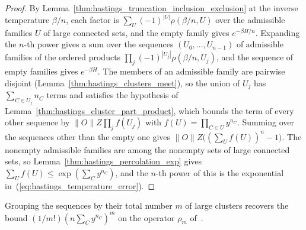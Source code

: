 \begin{proof}
    \leanok
    By Lemma~\ref{thm:hastings_truncation_inclusion_exclusion} at the inverse
    temperature $\beta/n$, each factor is $\sum_U(-1)^{|U|}\rho(\beta/n,U)$ over
    the admissible families $U$ of large connected sets, and the empty family
    gives $e^{-\beta H/n}$. Expanding the $n$-th power gives a sum over the
    sequences $(U_0,\dots,U_{n-1})$ of admissible families of the ordered
    products $\prod_j(-1)^{|U_j|}\rho(\beta/n,U_j)$, and the sequence of empty
    families gives $e^{-\beta H}$. The members of an admissible family are
    pairwise disjoint (Lemma~\ref{thm:hastings_clusters_meet}), so the union
    of $U_j$ has $\sum_{C\in U_j}n_C$ terms and satisfies the hypothesis of
    Lemma~\ref{thm:hastings_cluster_part_product}, which bounds the term of
    every other sequence by $\|O\|Z\prod_jf(U_j)$ with
    $f(U)=\prod_{C\in U}y^{n_C}$. Summing over the sequences other than the
    empty one gives $\|O\|Z\bigl((\sum_Uf(U))^n-1\bigr)$. The nonempty admissible
    families are among the nonempty sets of large connected sets, so
    Lemma~\ref{thm:hastings_percolation_exp} gives
    $\sum_Uf(U)\le\exp(\sum_Cy^{n_C})$, and the $n$-th power of this is the
    exponential in~(\ref{eq:hastings_temperature_error}).
\end{proof}

Grouping the sequences by their total number $m$ of large clusters recovers the
bound $(1/m!)(n\sum_Cy^{n_C})^m$ on the operator $\rho_m$
of~\cite[lines 1334--1341]{Hastings2006Solving}.

